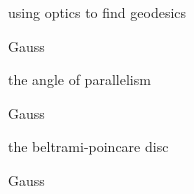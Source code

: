 \documentclass{article}
\newenvironment{andrew_section}[1]
    {
    \section{#1}
    \begin{itemize}
    }
    {
    \end{itemize}
    }
\begin{document}
\begin{andrew_section}{using optics to find geodesics}
    \item 
        Gauss
\end{andrew_section}

\begin{andrew_section}{the angle of parallelism}
    \item 
        Gauss
\end{andrew_section}

\begin{andrew_section}{the beltrami-poincare disc}
    \item 
        Gauss
\end{andrew_section}
\end{document}
